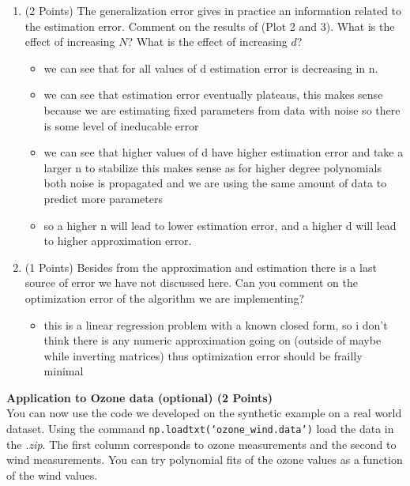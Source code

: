 \documentclass{article}
\begin{document}
\begin{enumerate}
\begin{itemize}
    \end{itemize}
    \item (2 Points) The generalization error gives in practice an information related to the estimation error. Comment on the results of (Plot 2 and 3). What is the effect of increasing $N$? What is the effect of increasing $d$?
    \begin{itemize}
           \item we can see that for all values of d estimation error is decreasing in n. 
             \item we can see that estimation error eventually plateaus, this makes sense because we are estimating fixed parameters from data with noise so there is some level of ineducable error
             \item we can see that higher values of d have higher estimation error and take a larger n to stabilize this makes sense as for higher degree polynomials both noise is propagated and we are using the same amount of data to predict more parameters 
             \item so a higher n will lead to lower estimation error, and a higher d will lead to higher approximation error. 
    \end{itemize}
    
    \item (1 Points) Besides from the approximation and estimation there is a last source of error we have not discussed here. Can you comment on the optimization error of the algorithm we are implementing?
    \begin{itemize}
        \item this is a linear regression problem with a known closed form, so i don't think there is any numeric approximation going on (outside of maybe while inverting matrices) thus optimization error should be frailly minimal 
    \end{itemize}
\setcounter{saveenum}{\value{enumi}}    
\end{enumerate}

\textbf{\color{nyupurple} Application to Ozone data (optional) (2 Points)}\\
You can now use the code we developed on the synthetic example on a real world dataset. Using the command \texttt{np.loadtxt(`ozone\_wind.data')} load the data in the \emph{.zip}. The first column corresponds to ozone measurements and the second to wind measurements. You can try polynomial fits of the ozone values as a function of the wind values. 
\end{document}
